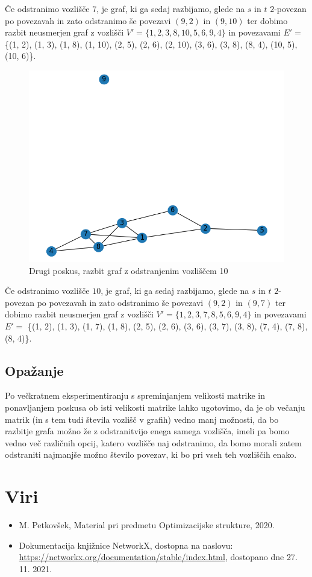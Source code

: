 \documentclass[a4paper,12pt]{article}
\theoremstyle{definition}
\begin{document}
Če odstranimo vozlišče $7$, je graf, ki ga sedaj razbijamo, glede na $s$ in $t$ 
$2$-povezan po povezavah in zato odstranimo še povezavi $(9, 2)$ in $(9, 10)$
ter dobimo razbit neusmerjen graf z vozlišči $V' = \{1, 2, 3, 8, 10, 5, 6, 9, 4\}$ in povezavami 
$E' =$ \{(1, 2), (1, 3), (1, 8), (1, 10), (2, 5), (2, 6), (2, 10), (3, 6), (3, 8), (8, 4), (10, 5), (10, 6)\}.\\

\begin{figure}[H]
	\caption{Drugi poskus, razbit graf z odstranjenim vozliščem 10}
	\centering
	\includegraphics[scale=0.4]{slikovni_prikaz/Figure_2_3}
\end{figure}

Če odstranimo vozlišče $10$, je graf, ki ga sedaj razbijamo, glede na $s$ in $t$ 
$2$-povezan po povezavah in zato odstranimo še povezavi $(9, 2)$ in $(9, 7)$
ter dobimo razbit neusmerjen graf z vozlišči $V' = \{1, 2, 3, 7, 8, 5, 6, 9, 4\}$ in povezavami 
$E' =$ \{(1, 2), (1, 3), (1, 7), (1, 8), (2, 5), (2, 6), (3, 6), (3, 7), (3, 8), (7, 4), (7, 8), (8, 4)\}.\\

\subsection{Opažanje}

Po večkratnem eksperimentiranju s spreminjanjem velikosti matrike in ponavljanjem poskusa
ob isti velikosti matrike lahko ugotovimo, da je ob večanju matrik (in s tem tudi števila 
vozlišč v grafih) vedno manj možnosti, da bo razbitje grafa možno že z odstranitvijo
enega samega vozlišča, imeli pa bomo vedno več različnih opcij, katero vozlišče naj odstranimo,
da bomo morali zatem odstraniti najmanjše možno število povezav, ki bo pri vseh teh vozliščih
enako.

\section{Viri}
\begin{itemize}
	\item M. Petkovšek, Material pri predmetu Optimizacijske strukture, 2020.
	\item Dokumentacija knjižnice NetworkX, dostopna na naslovu: \url{https://networkx.org/documentation/stable/index.html},
			dostopano dne 27. 11. 2021.
\end{itemize}
\end{document}
